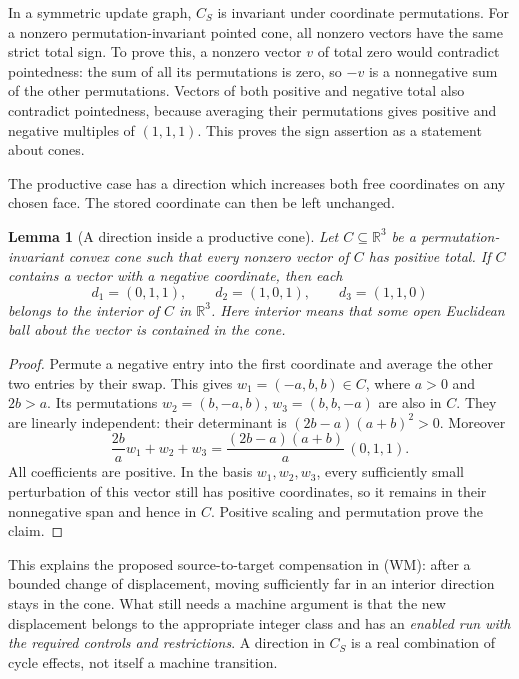 \documentclass[11pt,a4paper]{article}
\newtheorem{lemma}[theorem]{Lemma}
\theoremstyle{definition}
\theoremstyle{remark}
\newcommand{\R}{\mathbb R}
\begin{document}
In a symmetric update graph, \(C_S\) is invariant under coordinate
permutations. For a nonzero permutation-invariant pointed cone,
all nonzero vectors have the same strict total sign.
To prove this, a nonzero vector \(v\) of total zero would contradict
pointedness: the sum of all its permutations is zero, so
\(-v\) is a nonnegative sum of the other permutations.
Vectors of both positive and negative total also contradict
pointedness, because averaging their permutations gives positive and
negative multiples of \((1,1,1)\).
This proves the sign assertion as a statement about cones.

The productive case has a direction which increases both free
coordinates on any chosen face. The stored coordinate can then be
left unchanged.

\begin{lemma}[A direction inside a productive cone]
\label{lem:face-interior}
Let \(C\subseteq\R^3\) be a permutation-invariant convex cone such that
every nonzero vector of \(C\) has positive total.
If \(C\) contains a vector with a negative coordinate, then each
\[
 d_1=(0,1,1),\qquad d_2=(1,0,1),\qquad d_3=(1,1,0)
\]
belongs to the interior of \(C\) in \(\R^3\).
Here interior means that some open Euclidean ball about the vector
is contained in the cone.
\end{lemma}
\begin{proof}
Permute a negative entry into the first coordinate and average the
other two entries by their swap. This gives
\(w_1=(-a,b,b)\in C\), where \(a>0\) and \(2b>a\).
Its permutations \(w_2=(b,-a,b)\), \(w_3=(b,b,-a)\) are also in \(C\).
They are linearly independent: their determinant is
\((2b-a)(a+b)^2>0\). Moreover
\[
 \frac{2b}{a}w_1+w_2+w_3
    =\frac{(2b-a)(a+b)}{a}\,(0,1,1).
\]
All coefficients are positive. In the basis \(w_1,w_2,w_3\), every
sufficiently small perturbation of this vector still has positive
coordinates, so it remains in their nonnegative span and hence in
\(C\). Positive scaling and permutation prove the claim.
\end{proof}

This explains the proposed source-to-target compensation in (WM):
after a bounded change of displacement, moving sufficiently far in
an interior direction stays in the cone. What still needs a
machine argument is that the new displacement belongs to the
appropriate integer class and has an \emph{enabled run with the
required controls and restrictions}. A direction in \(C_S\) is a
real combination of cycle effects, not itself a machine transition.
\end{document}
